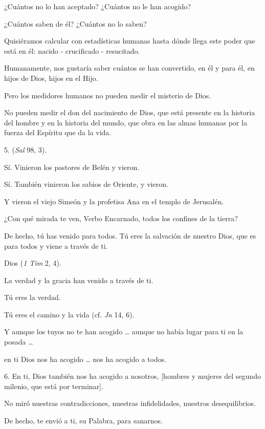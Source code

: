 \begin{body}
	¿Cuántos no lo han aceptado? ¿Cuántos no le han acogido?
	
	¿Cuántos saben de él? ¿Cuántos no lo saben?
	
	Quisiéramos calcular con estadísticas humanas hasta dónde llega este poder que está en él: nacido - crucificado - resucitado.
	
	Humanamente, nos gustaría saber cuántos se han convertido, en él y para él, en hijos de Dios, hijos en el Hijo.
	
	Pero los medidores humanos no pueden medir el misterio de Dios.
	
	No pueden medir el don del nacimiento de Dios, que está presente en la historia del hombre y en la historia del mundo, que obra en las almas humanas por la fuerza del Espíritu que da la vida.
	
	5.  (\emph{Sal} 98, 3).
	
	Sí. Vinieron los pastores de Belén y vieron.
	
	Sí. También vinieron los sabios de Oriente, y vieron.
	
	Y vieron el viejo Simeón y la profetisa Ana en el templo de Jerusalén.
	
	¿Con qué mirada te ven, Verbo Encarnado, todos los confines de la tierra?
	
	De hecho, tú has venido para todos. Tú eres la salvación de nuestro Dios, que es para todos y viene a través de ti.
	
	Dios  (\emph{1 Tim} 2, 4).
	
	La verdad y la gracia han venido a través de ti.
	
	Tú eres la verdad.
	
	Tú eres el camino y la vida (cf. \emph{Jn} 14, 6).
	
	Y aunque los tuyos no te han acogido \ldots{} aunque no había lugar para ti en la posada \ldots{}
	
	en ti Dios nos ha acogido \ldots{} nos ha acogido a todos.
	
	6. En ti, Dios también nos ha acogido a nosotros, {[}hombres y mujeres del segundo milenio, que está por terminar{]}.
	
	No miró nuestras contradicciones, nuestras infidelidades, nuestros desequilibrios.
	
	De hecho, te envió a ti, su Palabra, para sanarnos.
	

\end{body}
